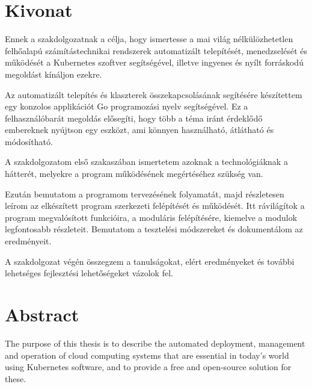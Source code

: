 \setcounter{page}{1}

\selecthungarian

\chapter*{Kivonat}

Ennek a szakdolgozatnak a célja, hogy ismertesse a mai világ nélkülözhetetlen felhőalapú számítástechnikai rendszerek automatizált telepítését, menedzselését és működését a Kubernetes szoftver segítségével, illetve ingyenes és nyílt forráskodú megoldást kínáljon ezekre. 

Az automatizált telepítés és klaszterek összekapcsolásának segítésére készítettem egy konzolos applikációt Go programozási nyelv segítségével.
Ez a felhasználóbarát megoldás elősegíti, hogy több a téma iránt érdeklődő embereknek nyújtson egy eszközt, ami könnyen használható, átlátható és módosítható.

A szakdolgozatom első szakaszában ismertetem azoknak a technológiáknak a hátterét, melyekre a program működésének megértéséhez szükség van.

Ezután bemutatom a programom tervezésének folyamatát, majd részletesen leírom az elkészített program szerkezeti felépítését és működését.
Itt rávilágítok a program megvalósított funkcióira, a moduláris felépítésére, kiemelve a modulok legfontosabb részleteit.
Bemutatom a tesztelési módszereket és dokumentálom az eredményeit.

A szakdolgozat végén összegzem a tanulságokat, elért eredményeket és további lehetséges fejlesztési lehetőségeket vázolok fel.

\vfill
\selectenglish


\chapter*{Abstract}

The purpose of this thesis is to describe the automated deployment, management and operation of cloud computing systems that are essential in today's world using Kubernetes software, and to provide a free and open-source solution for these. 

